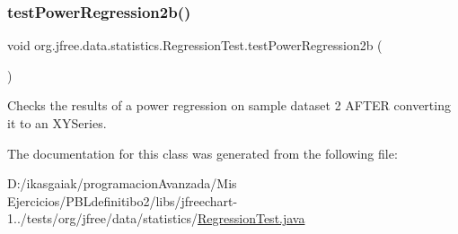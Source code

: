 \subsubsection{\texorpdfstring{test\+Power\+Regression2b()}{testPowerRegression2b()}}
{\footnotesize\ttfamily void org.\+jfree.\+data.\+statistics.\+Regression\+Test.\+test\+Power\+Regression2b (\begin{DoxyParamCaption}{ }\end{DoxyParamCaption})}

Checks the results of a power regression on sample dataset 2 A\+F\+T\+ER converting it to an X\+Y\+Series. 

The documentation for this class was generated from the following file\+:\begin{DoxyCompactItemize}
\item 
D\+:/ikasgaiak/programacion\+Avanzada/\+Mis Ejercicios/\+P\+B\+Ldefinitibo2/libs/jfreechart-\/1../tests/org/jfree/data/statistics/\mbox{\hyperlink{_regression_test_8java}{Regression\+Test.\+java}}\end{DoxyCompactItemize}
